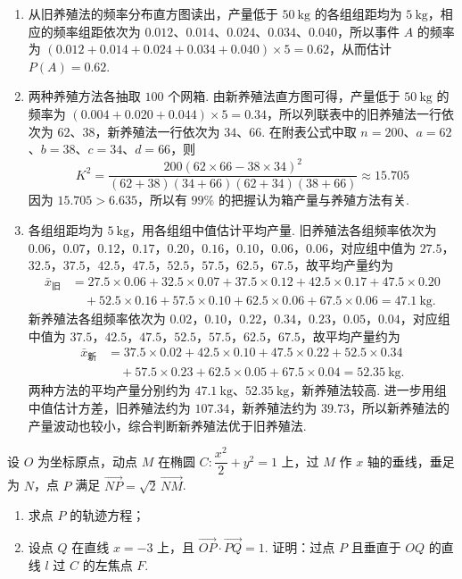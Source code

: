 \begin{solution}
\begin{enumerate}
\item 从旧养殖法的频率分布直方图读出，产量低于 \(50\mathrm{~kg}\) 的各组组距均为 \(5\mathrm{~kg}\)，相应的频率组距依次为 \(0.012\)、\(0.014\)、\(0.024\)、\(0.034\)、\(0.040\)，所以事件 \(A\) 的频率为 \((0.012+0.014+0.024+0.034+0.040)\times5=0.62\)，从而估计 \(P(A)=0.62\).
\item 两种养殖方法各抽取 \(100\) 个网箱. 由新养殖法直方图可得，产量低于 \(50\mathrm{~kg}\) 的频率为 \((0.004+0.020+0.044)\times5=0.34\)，所以列联表中的旧养殖法一行依次为 \(62\)、\(38\)，新养殖法一行依次为 \(34\)、\(66\). 在附表公式中取 \(n=200\)、\(a=62\)、\(b=38\)、\(c=34\)、\(d=66\)，则
\[
K^2=\frac{200(62\times66-38\times34)^2}{(62+38)(34+66)(62+34)(38+66)}\approx15.705
\]
因为 \(15.705>6.635\)，所以有 \(99\%\) 的把握认为箱产量与养殖方法有关.
\item 各组组距均为 \(5\mathrm{~kg}\)，用各组组中值估计平均产量. 旧养殖法各组频率依次为
\(0.06\)，\(0.07\)，\(0.12\)，\(0.17\)，\(0.20\)，\(0.16\)，\(0.10\)，\(0.06\)，\(0.06\)，对应组中值为
\(27.5\)，\(32.5\)，\(37.5\)，\(42.5\)，\(47.5\)，\(52.5\)，\(57.5\)，\(62.5\)，\(67.5\)，故平均产量约为
\[
\begin{aligned}
\bar x_\text{旧}
&=27.5\times0.06+32.5\times0.07+37.5\times0.12+42.5\times0.17+47.5\times0.20\\
&\quad+52.5\times0.16+57.5\times0.10+62.5\times0.06+67.5\times0.06=47.1\mathrm{~kg}.
\end{aligned}
\]
新养殖法各组频率依次为 \(0.02\)，\(0.10\)，\(0.22\)，\(0.34\)，\(0.23\)，\(0.05\)，\(0.04\)，对应组中值为
\(37.5\)，\(42.5\)，\(47.5\)，\(52.5\)，\(57.5\)，\(62.5\)，\(67.5\)，故平均产量约为
\[
\begin{aligned}
\bar x_\text{新}
&=37.5\times0.02+42.5\times0.10+47.5\times0.22+52.5\times0.34\\
&\quad+57.5\times0.23+62.5\times0.05+67.5\times0.04=52.35\mathrm{~kg}.
\end{aligned}
\]
两种方法的平均产量分别约为 \(47.1\mathrm{~kg}\)、\(52.35\mathrm{~kg}\)，新养殖法较高. 进一步用组中值估计方差，旧养殖法约为 \(107.34\)，新养殖法约为 \(39.73\)，所以新养殖法的产量波动也较小，综合判断新养殖法优于旧养殖法.
\end{enumerate}
\end{solution}

\begin{problem}
设 \(O\) 为坐标原点，动点 \(M\) 在椭圆 \(C:\dfrac{x^2}{2}+y^2=1\) 上，过 \(M\) 作 \(x\) 轴的垂线，垂足为 \(N\)，点 \(P\) 满足 \(\overrightarrow{NP}=\sqrt2\,\overrightarrow{NM}\).
\begin{enumerate}
\item 求点 \(P\) 的轨迹方程；
\item 设点 \(Q\) 在直线 \(x=-3\) 上，且 \(\overrightarrow{OP}\cdot\overrightarrow{PQ}=1\). 证明：过点 \(P\) 且垂直于 \(OQ\) 的直线 \(l\) 过 \(C\) 的左焦点 \(F\).
\end{enumerate}
\end{problem}

